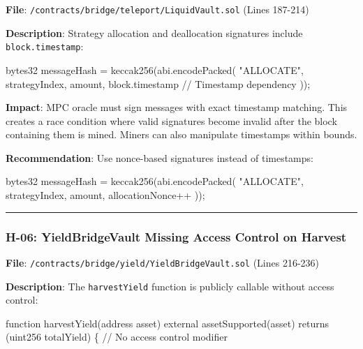 \documentclass[
]{article}
\newenvironment{Shaded}{}{}
\newcommand{\NormalTok}[1]{#1}
\begin{document}
\textbf{File}: \texttt{/contracts/bridge/teleport/LiquidVault.sol}
(Lines 187-214)

\textbf{Description}: Strategy allocation and deallocation signatures
include \texttt{block.timestamp}:

\begin{Shaded}
\begin{Highlighting}[]
\NormalTok{bytes32 messageHash = keccak256(abi.encodePacked(}
\NormalTok{    "ALLOCATE",}
\NormalTok{    strategyIndex,}
\NormalTok{    amount,}
\NormalTok{    block.timestamp  // Timestamp dependency}
\NormalTok{));}
\end{Highlighting}
\end{Shaded}

\textbf{Impact}: MPC oracle must sign messages with exact timestamp
matching. This creates a race condition where valid signatures become
invalid after the block containing them is mined. Miners can also
manipulate timestamps within bounds.

\textbf{Recommendation}: Use nonce-based signatures instead of
timestamps:

\begin{Shaded}
\begin{Highlighting}[]
\NormalTok{bytes32 messageHash = keccak256(abi.encodePacked(}
\NormalTok{    "ALLOCATE",}
\NormalTok{    strategyIndex,}
\NormalTok{    amount,}
\NormalTok{    allocationNonce++}
\NormalTok{));}
\end{Highlighting}
\end{Shaded}

\begin{center}\rule{0.5\linewidth}{0.5pt}\end{center}

\subsubsection{H-06: YieldBridgeVault Missing Access Control on
Harvest}\label{h-06-yieldbridgevault-missing-access-control-on-harvest}

\textbf{File}: \texttt{/contracts/bridge/yield/YieldBridgeVault.sol}
(Lines 216-236)

\textbf{Description}: The \texttt{harvestYield} function is publicly
callable without access control:

\begin{Shaded}
\begin{Highlighting}[]
\NormalTok{function harvestYield(address asset) external assetSupported(asset) returns (uint256 totalYield) \{}
\NormalTok{    // No access control modifier}
\end{Highlighting}
\end{Shaded}
\end{document}
